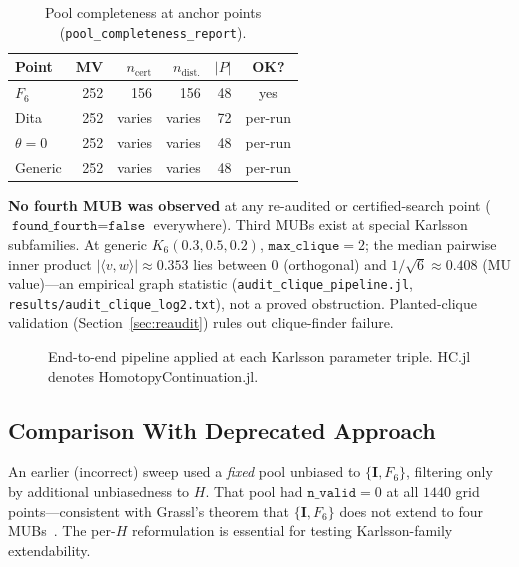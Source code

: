 \documentclass[onecolumn]{IEEEtran}
\newcommand{\repo}[1]{{\ttfamily\nolinkurl{#1}}}
\begin{document}
\begin{table}[t]
\caption{Pool completeness at anchor points (\texttt{pool\_completeness\_report}).}
\label{tab:poolcomplete}
\centering
\footnotesize
\setlength{\tabcolsep}{2.5pt}
\begin{tabular}{@{}lrrrrc@{}}
\toprule
Point & MV & $n_{\text{cert}}$ & $n_{\text{dist.}}$ & $|P|$ & OK? \\
\midrule
$F_6$ & 252 & 156 & 156 & 48 & yes \\
Dita & 252 & varies & varies & 72 & per-run \\
$\theta=0$ & 252 & varies & varies & 48 & per-run \\
Generic & 252 & varies & varies & 48 & per-run \\
\bottomrule
\end{tabular}
\end{table}

\textbf{No fourth MUB was observed} at any re-audited or certified-search point ($\texttt{found\_fourth}=\texttt{false}$ everywhere).
Third MUBs exist at special Karlsson subfamilies.
At generic $K_6(0.3,0.5,0.2)$, $\texttt{max\_clique}=2$; the median pairwise inner product $|\langle v,w\rangle|\approx0.353$ lies between $0$ (orthogonal) and $1/\sqrt{6}\approx0.408$ (MU value)---an empirical graph statistic (\repo{audit_clique_pipeline.jl}, \repo{results/audit_clique_log2.txt}), not a proved obstruction.
Planted-clique validation (Section~\ref{sec:reaudit}) rules out clique-finder failure.

\begin{figure}[t]
\centering
{}
\caption{End-to-end pipeline applied at each Karlsson parameter triple. HC.jl denotes HomotopyContinuation.jl.}
\label{fig:pipeline}
\end{figure}

\subsection{Comparison With Deprecated Approach}
An earlier (incorrect) sweep used a \emph{fixed} pool unbiased to $\{\mathbf{I},F_6\}$, filtering only by additional unbiasedness to $H$.
That pool had $\texttt{n\_valid}=0$ at all $1440$ grid points---consistent with Grassl's theorem that $\{\mathbf{I},F_6\}$ does not extend to four MUBs~\cite{Grassl2004}.
The per-$H$ reformulation is essential for testing Karlsson-family extendability.
\end{document}
